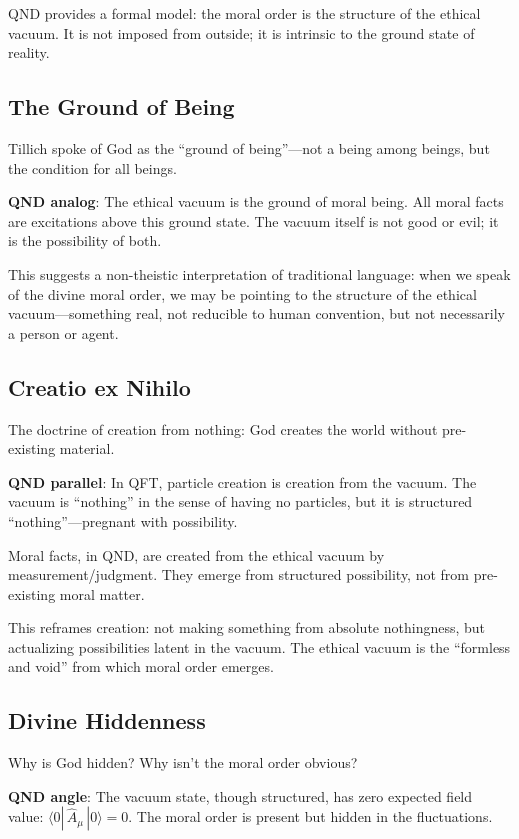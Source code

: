 \documentclass[12pt]{article}
\begin{document}
QND provides a formal model: the moral order is the structure of the ethical vacuum. It is not imposed from outside; it is intrinsic to the ground state of reality.

\subsection{The Ground of Being}

Tillich spoke of God as the ``ground of being''---not a being among beings, but the condition for all beings.

\textbf{QND analog}: The ethical vacuum is the ground of moral being. All moral facts are excitations above this ground state. The vacuum itself is not good or evil; it is the possibility of both.

This suggests a non-theistic interpretation of traditional language: when we speak of the divine moral order, we may be pointing to the structure of the ethical vacuum---something real, not reducible to human convention, but not necessarily a person or agent.

\subsection{Creatio ex Nihilo}

The doctrine of creation from nothing: God creates the world without pre-existing material.

\textbf{QND parallel}: In QFT, particle creation is creation from the vacuum. The vacuum is ``nothing'' in the sense of having no particles, but it is structured ``nothing''---pregnant with possibility.

Moral facts, in QND, are created from the ethical vacuum by measurement/judgment. They emerge from structured possibility, not from pre-existing moral matter.

This reframes creation: not making something from absolute nothingness, but actualizing possibilities latent in the vacuum. The ethical vacuum is the ``formless and void'' from which moral order emerges.

\subsection{Divine Hiddenness}

Why is God hidden? Why isn't the moral order obvious?

\textbf{QND angle}: The vacuum state, though structured, has zero expected field value: $\langle 0| \,\hat{A}_\mu\, |0\rangle = 0$. The moral order is present but hidden in the fluctuations.
\end{document}
